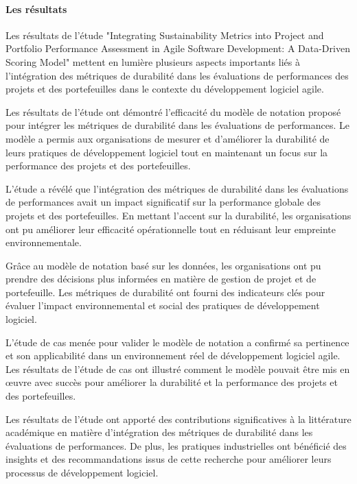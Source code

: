 \paragraph{Les résultats}
Les résultats de l'étude "Integrating Sustainability Metrics into Project and Portfolio Performance Assessment in Agile Software Development: A Data-Driven Scoring Model" mettent en lumière plusieurs aspects importants liés à l'intégration des métriques de durabilité dans les évaluations de performances des projets et des portefeuilles dans le contexte du développement logiciel agile.

Les résultats de l'étude ont démontré l'efficacité du modèle de notation proposé pour intégrer les métriques de durabilité dans les évaluations de performances. Le modèle a permis aux organisations de mesurer et d'améliorer la durabilité de leurs pratiques de développement logiciel tout en maintenant un focus sur la performance des projets et des portefeuilles.

L'étude a révélé que l'intégration des métriques de durabilité dans les évaluations de performances avait un impact significatif sur la performance globale des projets et des portefeuilles. En mettant l'accent sur la durabilité, les organisations ont pu améliorer leur efficacité opérationnelle tout en réduisant leur empreinte environnementale.

Grâce au modèle de notation basé sur les données, les organisations ont pu prendre des décisions plus informées en matière de gestion de projet et de portefeuille. Les métriques de durabilité ont fourni des indicateurs clés pour évaluer l'impact environnemental et social des pratiques de développement logiciel.

L'étude de cas menée pour valider le modèle de notation a confirmé sa pertinence et son applicabilité dans un environnement réel de développement logiciel agile. Les résultats de l'étude de cas ont illustré comment le modèle pouvait être mis en œuvre avec succès pour améliorer la durabilité et la performance des projets et des portefeuilles.

Les résultats de l'étude ont apporté des contributions significatives à la littérature académique en matière d'intégration des métriques de durabilité dans les évaluations de performances. De plus, les pratiques industrielles ont bénéficié des insights et des recommandations issus de cette recherche pour améliorer leurs processus de développement logiciel.